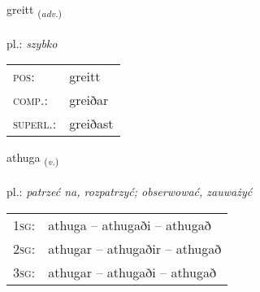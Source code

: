 \documentclass[frontgrid, backgrid]{flacards}\usepackage[]{graphicx}\usepackage[]{xcolor}
\begin{document}
\renewcommand{\flhead}{\vskip5pt \fboxsep=0pt {\small\bfseries\footnotesize Atviksorð | Adverb}}
\renewcommand{\fcfoot}{\vskip5pt \fboxsep=0pt \hspace{2pt}{\small\bfseries\footnotesize 2K}}

\renewcommand{\blhead}{\vskip5pt {\small\bfseries\footnotesize Atviksorð | Adverb }}
\renewcommand{\bcfoot}{\vskip5pt \hspace{2pt}{\small\bfseries\footnotesize 2K}}


{greitt \small{\textsubscript{(\textit{adv.})}} \\[1ex] %
\textphonetic{[kreiht]} \\
pl.: \emph{szybko} \\  [2ex]
\renewcommand*{\arraystretch}{0.8}
\begin{tabular}{ll}
\textsc{pos}: & greitt \\ 
\textsc{comp.}: & greiðar \\ 
\textsc{superl.}: & greiðast \\
\end{tabular}
}

\renewcommand{\flhead}{\vskip5pt \fboxsep=0pt {\small\bfseries\footnotesize Sagnorð | Verb}}
\renewcommand{\fcfoot}{\vskip5pt \fboxsep=0pt \hspace{2pt}{\small\bfseries\footnotesize 2K}}

\renewcommand{\blhead}{\vskip5pt {\small\bfseries\footnotesize Sagnorð | Verb }}
\renewcommand{\bcfoot}{\vskip5pt \hspace{2pt}{\small\bfseries\footnotesize 2K}}


{athuga \small{\textsubscript{(\textit{v.})}} \\[1ex] %
\textphonetic{[aːthʏɣa]} \\
pl.: \emph{patrzeć na, rozpatrzyć; obserwować, zauważyć} \\  [2ex]
\renewcommand*{\arraystretch}{0.8}
\begin{tabular}{p{1cm}l}
\textsc{1sg}: & athuga -- athugaði -- athugað \\ 
\textsc{2sg}: & athugar -- athugaðir -- athugað \\ 
\textsc{3sg}: & athugar -- athugaði -- athugað \\ 
\end{tabular}
}
\end{document}
